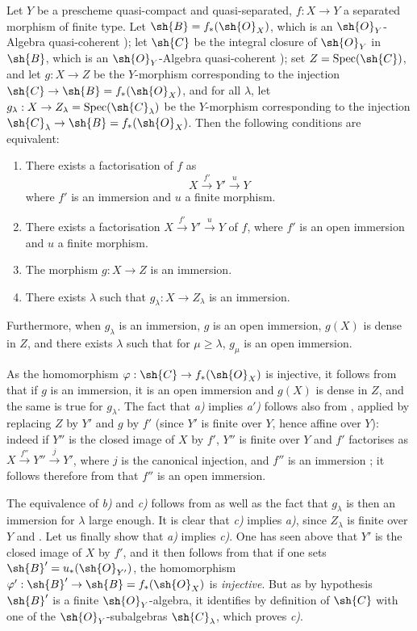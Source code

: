 \begin{proposition}[8.12.3]
\label{IV.8.12.3}
Let $Y$ be a prescheme quasi-compact and quasi-separated, $f:X\to Y$ a separated morphism of finite type.
Let $\sh{B}=f_*(\sh{O}_X)$, which is an $\sh{O}_Y$-Algebra quasi-coherent ); let $\sh{C}$ be the integral closure of $\sh{O}_Y$ in $\sh{B}$, which is an $\sh{O}_Y$-Algebra quasi-coherent ); set $Z=\operatorname{Spec}(\sh{C})$, and let $g:X\to Z$ be the $Y$-morphism corresponding to the injection $\sh{C}\to\sh{B}=f_*(\sh{O}_X)$, and for all $\lambda$, let $g_\lambda:X\to Z_\lambda=\operatorname{Spec}(\sh{C}_\lambda)$ be the $Y$-morphism corresponding to the injection $\sh{C}_\lambda\to\sh{B}=f_*(\sh{O}_X)$.
Then the following conditions are equivalent:
\begin{enumerate}[label=\emph{\alph*)}]
  \item[\emph{a)}] There exists a factorisation of $f$ as
\[
X\xrightarrow{f'}Y'\xrightarrow{u}Y
\]
where $f'$ is an immersion and $u$ a finite morphism.
  \item[\emph{a$'$)}] There exists a factorisation $X\xrightarrow{f'}Y'\xrightarrow{u}Y$ of $f$, where $f'$ is an open immersion and $u$ a finite morphism.
  \item[\emph{b)}] The morphism $g:X\to Z$ is an immersion.
  \item[\emph{c)}] There exists $\lambda$ such that $g_\lambda:X\to Z_\lambda$ is an immersion.
\end{enumerate}
Furthermore, when $g_\lambda$ is an immersion, $g$ is an open immersion, $g(X)$ is dense in $Z$, and there exists $\lambda$ such that for $\mu\geqslant\lambda$, $g_\mu$ is an open immersion.
\end{proposition}

As the homomorphism $\varphi:\sh{C}\to f_*(\sh{O}_X)$ is injective, it follows from  that if $g$ is an immersion, it is an open immersion and $g(X)$ is dense in $Z$, and the same is true for $g_\lambda$.
The fact that \emph{a)} implies \emph{a$'$)} follows also from , applied by replacing $Z$ by $Y'$ and $g$ by $f'$ (since $Y'$ is finite over $Y$, hence affine over $Y$): indeed if $Y''$ is the closed image of $X$ by $f'$, $Y''$ is finite over $Y$ and $f'$ factorises as $X\xrightarrow{f''}Y''\xrightarrow{j}Y'$, where $j$ is the canonical injection, and $f''$ is an immersion ; it follows therefore from  that $f''$ is an open immersion.

The equivalence of \emph{b)} and \emph{c)} follows from  as well as the fact that $g_\lambda$ is then an immersion for $\lambda$ large enough.
It is clear that \emph{c)} implies \emph{a)}, since $Z_\lambda$ is finite over $Y$  and .
Let us finally show that \emph{a)} implies \emph{c)}.
One has seen above that $Y'$ is the closed image of $X$ by $f'$, and it then follows from  that if one sets $\sh{B}'=u_*(\sh{O}_{Y'})$, the homomorphism $\varphi':\sh{B}'\to\sh{B}=f_*(\sh{O}_X)$ is \emph{injective}.
But as by hypothesis $\sh{B}'$ is a finite $\sh{O}_Y$-algebra, it identifies by definition of $\sh{C}$ with one of the $\sh{O}_Y$-subalgebras $\sh{C}_\lambda$, which proves \emph{c)}.

